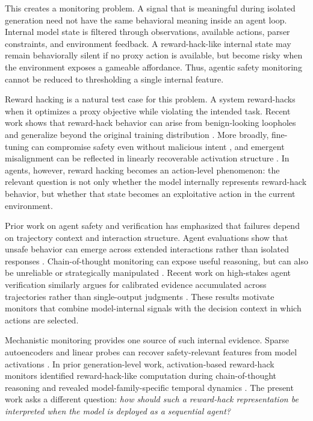 \documentclass{article}
\theoremstyle{plain}
\theoremstyle{definition}
\theoremstyle{remark}
\begin{document}
This creates a monitoring problem. A signal that is meaningful during isolated generation need not have the same behavioral meaning inside an agent loop. Internal model state is filtered through observations, available actions, parser constraints, and environment feedback. A reward-hack-like internal state may remain behaviorally silent if no proxy action is available, but become risky when the environment exposes a gameable affordance. Thus, agentic safety monitoring cannot be reduced to thresholding a single internal feature.

Reward hacking is a natural test case for this problem. A system reward-hacks when it optimizes a proxy objective while violating the intended task. Recent work shows that reward-hack behavior can arise from benign-looking loopholes and generalize beyond the original training distribution \citep{taylor2025school}. More broadly, fine-tuning can compromise safety even without malicious intent \citep{wei2023finetuning}, and emergent misalignment can be reflected in linearly recoverable activation structure \citep{soligo2025convergent}. In agents, however, reward hacking becomes an action-level phenomenon: the relevant question is not only whether the model internally represents reward-hack behavior, but whether that state becomes an exploitative action in the current environment.

Prior work on agent safety and verification has emphasized that failures depend on trajectory context and interaction structure. Agent evaluations show that unsafe behavior can emerge across extended interactions rather than isolated responses \citep{safepro2026, lee2026noisybench}. Chain-of-thought monitoring can expose useful reasoning, but can also be unreliable or strategically manipulated \citep{baker2025monitoring, chen2025reasoning, za2026persuasion, jiralerspong2026noticing}. Recent work on high-stakes agent verification similarly argues for calibrated evidence accumulated across trajectories rather than single-output judgments \citep{zhang2026glean}. These results motivate monitors that combine model-internal signals with the decision context in which actions are selected.

Mechanistic monitoring provides one source of such internal evidence. Sparse autoencoders and linear probes can recover safety-relevant features from model activations \citep{bricken2023monosemanticity, gao2024scaling}. In prior generation-level work, activation-based reward-hack monitors identified reward-hack-like computation during chain-of-thought reasoning and revealed model-family-specific temporal dynamics \citep{wilhelm2026monitoring}. The present work asks a different question: \emph{how should such a reward-hack representation be interpreted when the model is deployed as a sequential agent?}
\end{document}

